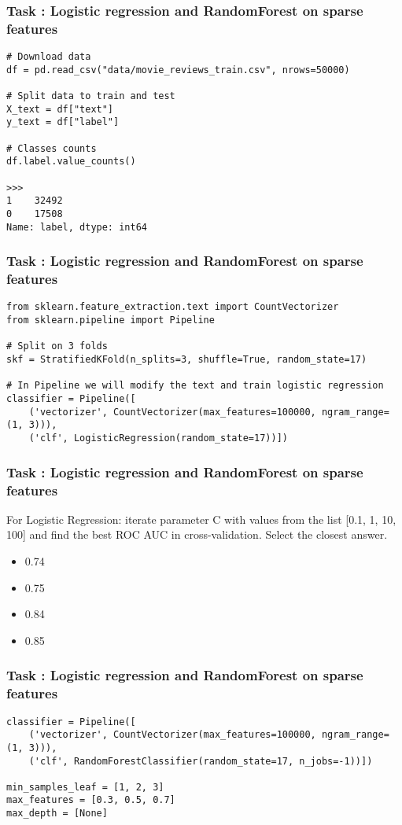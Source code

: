 \begin{frame}[fragile]\frametitle{Task : Logistic regression and RandomForest on sparse features}

\begin{lstlisting}
# Download data
df = pd.read_csv("data/movie_reviews_train.csv", nrows=50000)

# Split data to train and test
X_text = df["text"]
y_text = df["label"]

# Classes counts
df.label.value_counts()

>>>
1    32492
0    17508
Name: label, dtype: int64
\end{lstlisting}
\end{frame}

\begin{frame}[fragile]\frametitle{Task : Logistic regression and RandomForest on sparse features}

\begin{lstlisting}
from sklearn.feature_extraction.text import CountVectorizer
from sklearn.pipeline import Pipeline

# Split on 3 folds
skf = StratifiedKFold(n_splits=3, shuffle=True, random_state=17)

# In Pipeline we will modify the text and train logistic regression
classifier = Pipeline([
    ('vectorizer', CountVectorizer(max_features=100000, ngram_range=(1, 3))),
    ('clf', LogisticRegression(random_state=17))])
\end{lstlisting}
\end{frame}

\begin{frame}[fragile]\frametitle{Task : Logistic regression and RandomForest on sparse features}
For Logistic Regression: iterate parameter C with values from the list [0.1, 1, 10, 100] and find the best ROC AUC in cross-validation. Select the closest answer.

\begin{itemize}
\item 0.74
\item 0.75
\item 0.84
\item 0.85
\end{itemize}

\end{frame}

\begin{frame}[fragile]\frametitle{Task : Logistic regression and RandomForest on sparse features}

\begin{lstlisting}
classifier = Pipeline([
    ('vectorizer', CountVectorizer(max_features=100000, ngram_range=(1, 3))),
    ('clf', RandomForestClassifier(random_state=17, n_jobs=-1))])

min_samples_leaf = [1, 2, 3]
max_features = [0.3, 0.5, 0.7]
max_depth = [None]
\end{lstlisting}
\end{frame}
